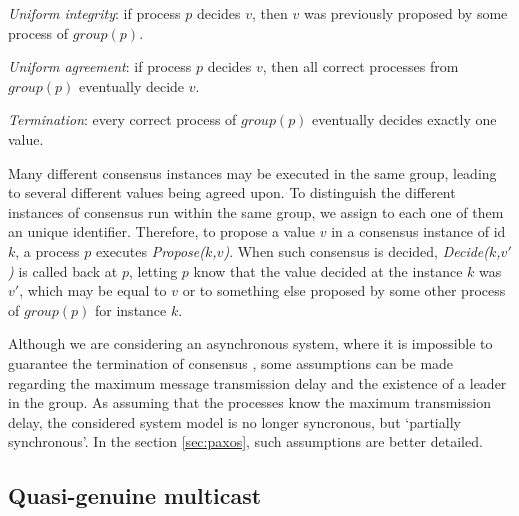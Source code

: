 \documentclass[times, 10pt]{article}
\begin{document}
\textit{Uniform integrity}: if process $p$ decides $v$, then $v$ was previously proposed by some process of $group(p)$.

\textit{Uniform agreement}: if process $p$ decides $v$, then all correct processes from $group(p)$ eventually decide $v$.

\textit{Termination}: every correct process of $group(p)$ eventually decides exactly one value.

Many different consensus instances may be executed in the same group, leading to several different values being agreed upon. To distinguish the different instances of consensus run within the same group, we assign to each one of them an unique identifier. Therefore, to propose a value $v$ in a consensus instance of id $k$, a process  $p$ executes \textit{Propose($k$,$v$)}. When such consensus is decided, \textit{Decide($k$,$v'$)} is called back at $p$, letting $p$ know that the value decided at the instance $k$ was $v'$, which may be equal to $v$ or to something else proposed by some other process of $group(p)$ for instance $k$.

Although we are considering an asynchronous system, where it is impossible to guarantee the termination of consensus \cite{fischer1985idc}, some assumptions can be made regarding the maximum message transmission delay and the existence of a leader in the group. As assuming that the processes know the maximum transmission delay, the considered system model is no longer syncronous, but `partially synchronous'. In the section \ref{sec:paxos}, such assumptions are better detailed.

\subsection{Quasi-genuine multicast}

\end{document}
